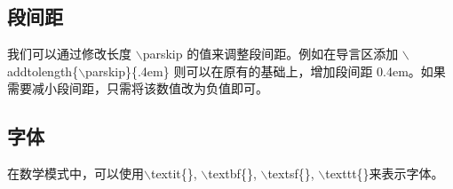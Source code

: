 \documentclass{thesis}
\begin{document}
\subsection{段间距}
我们可以通过修改长度 $\backslash$parskip 的值来调整段间距。例如在导言区添加
$\backslash$addtolength\{$\backslash$parskip\}\{.4em\}
则可以在原有的基础上，增加段间距 0.4em。如果需要减小段间距，只需将该数值改为负值即可。
\subsection{字体}
在数学模式中，可以使用$\backslash$textit\{\}, $\backslash$textbf\{\}, 
$\backslash$textsf\{\}, $\backslash$texttt\{\}来表示字体。
\newpage
{}

 
\end{document}
